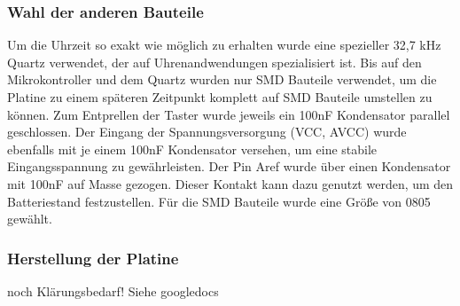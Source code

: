 \subsubsection{Wahl der anderen Bauteile}
Um die Uhrzeit so exakt wie möglich zu erhalten wurde eine spezieller 32,7 kHz Quartz verwendet, der auf Uhrenandwendungen spezialisiert ist. Bis auf den Mikrokontroller und dem Quartz wurden nur SMD Bauteile verwendet, um die Platine zu einem späteren Zeitpunkt komplett auf SMD Bauteile umstellen zu können. Zum Entprellen der Taster wurde jeweils ein 100nF Kondensator parallel geschlossen. Der Eingang der Spannungsversorgung (VCC, AVCC) wurde ebenfalls mit je einem 100nF Kondensator versehen, um eine stabile Eingangsspannung zu gewährleisten.
Der Pin Aref wurde über einen Kondensator mit 100nF auf Masse gezogen. Dieser Kontakt kann dazu genutzt werden, um den Batteriestand festzustellen. Für die SMD Bauteile wurde eine Größe von 0805 gewählt. 

\subsubsection{Herstellung der Platine}
noch Klärungsbedarf! Siehe googledocs